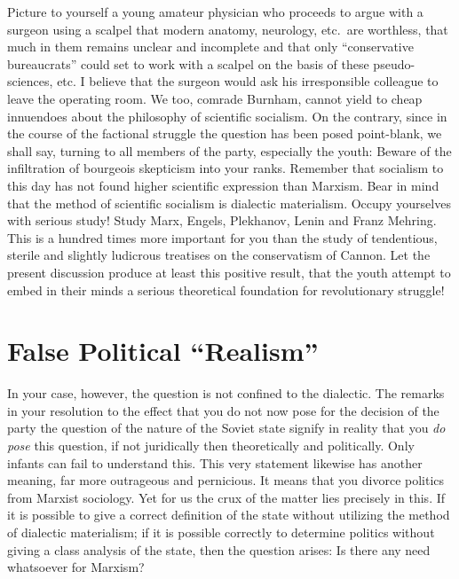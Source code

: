 Picture to yourself a young amateur physician who proceeds to argue with a surgeon using a scalpel that modern anatomy, neurology, etc.\ are worthless, that much in them remains unclear and incomplete and that only “conservative bureaucrats” could set to work with a scalpel on the basis of these pseudo-sciences, etc. I believe that the surgeon would ask his irresponsible colleague to leave the operating room. We too, comrade Burnham, cannot yield to cheap innuendoes about the philosophy of scientific socialism. On the contrary, since in the course of the factional struggle the question has been posed point-blank, we shall say, turning to all members of the party, especially the youth: Beware of the infiltration of bourgeois skepticism into your ranks. Remember that socialism to this day has not found higher scientific expression than Marxism. Bear in mind that the method of scientific socialism is dialectic materialism. Occupy yourselves with serious study! Study Marx, Engels, Plekhanov, Lenin and Franz Mehring. This is a hundred times more important for you than the study of tendentious, sterile and slightly ludicrous treatises on the conservatism of Cannon. Let the present discussion produce at least this positive result, that the youth attempt to embed in their minds a serious theoretical foundation for revolutionary struggle!

\section*{False Political “Realism”}

In your case, however, the question is not confined to the dialectic. The remarks in your resolution to the effect that you do not now pose for the decision of the party the question of the nature of the Soviet state signify in reality that you \emph{do pose} this question, if not juridically then theoretically and politically. Only infants can fail to understand this. This very statement likewise has another meaning, far more outrageous and pernicious. It means that you divorce politics from Marxist sociology. Yet for us the crux of the matter lies precisely in this. If it is possible to give a correct definition of the state without utilizing the method of dialectic materialism; if it is possible correctly to determine politics without giving a class analysis of the state, then the question arises: Is there any need whatsoever for Marxism?

